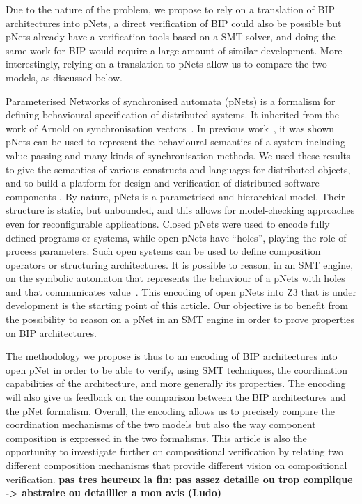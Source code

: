 \documentclass{llncs}
\begin{document}
Due to the nature of the problem, we propose to rely on a translation of BIP architectures into pNets, a direct verification of BIP could also be possible but pNets already have a verification tools based on a SMT solver, and doing the same work for BIP would require  a large amount of similar development. More interestingly, relying on a translation to pNets allow us to compare the two models, as discussed below.

Parameterised Networks of synchronised automata (pNets) is a formalism for defining behavioural specification of distributed systems.
It inherited from the work of
Arnold on synchronisation vectors~\cite{Arnold1982}. 
In previous work~\cite{HMZ:PDP15}, it was shown pNets can be used to represent the behavioural semantics
of a system 
including value-passing and many kinds of synchronisation methods. We
used these results to give the semantics of various constructs and
languages for distributed objects, and to build a platform for design
and verification of distributed software components
\cite{CM:FMCO08,HKM-FASE16}. 
By nature, pNets is a  parametrised and hierarchical model.
Their structure is static, but unbounded, and this allows for model-checking
approaches even for reconfigurable applications.
Closed pNets were used to encode fully defined programs or systems,
while open pNets have ``holes'', playing the role of process
parameters. Such open systems can be used to define composition operators or structuring architectures.
It is possible to reason, in an SMT engine, on the symbolic automaton that represents the behaviour of a pNets with holes and that communicates value~\cite{HMZ-FORTE2016QBMZ-AVOCS18}. This encoding of open pNets into Z3 that is under development is the starting point of this article. Our objective is to benefit from the possibility to reason on a pNet in an SMT engine in order to prove properties on BIP architectures.

The methodology we propose is thus to an encoding of BIP architectures into open pNet in order to be able to verify, using SMT techniques, the coordination capabilities of the architecture, and more generally its properties. The encoding will also give us feedback on the comparison between the BIP architectures and the pNet formalism. 
Overall, the encoding allows us to precisely compare the coordination mechanisms of the two models but also the way component composition is expressed in the two formalisms. This article is also the opportunity to investigate further on  compositional verification by relating two different composition mechanisms that provide different vision on compositional verification. \textbf{pas tres heureux la fin: pas assez detaille ou trop complique -> abstraire ou detailller a mon avis (Ludo)}
\end{document}
